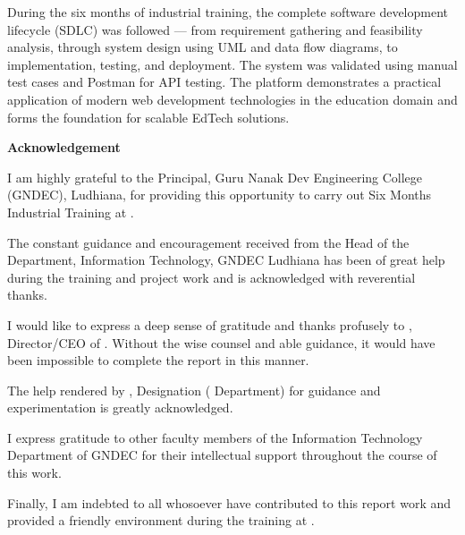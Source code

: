 \documentclass[12pt, a4paper, oneside]{report}
\begin{document}
During the six months of industrial training, the complete software development lifecycle (SDLC) was followed --- from requirement gathering and feasibility analysis, through system design using UML and data flow diagrams, to implementation, testing, and deployment. The system was validated using manual test cases and Postman for API testing. The platform demonstrates a practical application of modern web development technologies in the education domain and forms the foundation for scalable EdTech solutions.

\newpage
{}
\begin{center}
{\fontsize{16}{19}\selectfont\bfseries Acknowledgement}
\end{center}

\vspace{0.5cm}

I am highly grateful to the Principal, Guru Nanak Dev Engineering College (GNDEC), Ludhiana, for providing this opportunity to carry out Six Months Industrial Training at \underline{\hspace{4cm}}.

The constant guidance and encouragement received from the Head of the Department, Information Technology, GNDEC Ludhiana has been of great help during the training and project work and is acknowledged with reverential thanks.

I would like to express a deep sense of gratitude and thanks profusely to \underline{\hspace{3cm}}, Director/CEO of \underline{\hspace{3cm}}. Without the wise counsel and able guidance, it would have been impossible to complete the report in this manner.

The help rendered by \underline{\hspace{3cm}}, Designation (\underline{\hspace{2.5cm}} Department) for guidance and experimentation is greatly acknowledged.

I express gratitude to other faculty members of the Information Technology Department of GNDEC for their intellectual support throughout the course of this work.

Finally, I am indebted to all whosoever have contributed to this report work and provided a friendly environment during the training at \underline{\hspace{3cm}}.
\end{document}
